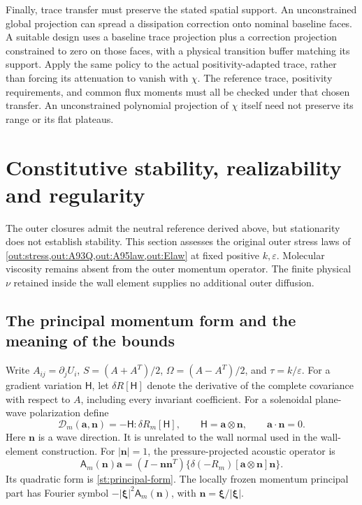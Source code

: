 \documentclass[11pt,a4paper]{article}
\numberwithin{equation}{section}
\newcommand{\eps}{\varepsilon}
\begin{document}
Finally, trace transfer must preserve the stated spatial support.
An unconstrained global projection can spread a dissipation
correction onto nominal baseline faces.  A suitable design uses a
baseline trace projection plus a correction projection constrained
to zero on those faces, with a physical transition buffer matching
its support.  Apply the same policy to the actual positivity-adapted
trace, rather than forcing its attenuation to vanish with $\chi$.
The reference trace, positivity requirements, and common flux
moments must all be checked under that chosen transfer.  An
unconstrained polynomial projection of $\chi$ itself need not preserve
its range or its flat plateaus.

\section{Constitutive stability, realizability and regularity}
\label{st:constitutive}

The outer closures admit the neutral reference derived above, but
stationarity does not establish stability. This section assesses the
original outer stress laws of
\cref{out:stress,out:A93Q,out:A95law,out:Elaw} at fixed positive
$k,\eps$. Molecular
viscosity remains absent from the outer momentum operator. The finite
physical $\nu$ retained inside the wall element supplies no additional
outer diffusion.

\subsection{The principal momentum form and the meaning of the bounds}
\label{st:principal}

Write $A_{ij}=\partial_jU_i$, $S=(A+A^T)/2$,
$\Omega=(A-A^T)/2$, and $\tau=k/\eps$. For a gradient variation
$\mathsf H$, let $\delta R[\mathsf H]$ denote the derivative of the
complete covariance with respect to $A$, including every invariant
coefficient. For a solenoidal plane-wave polarization define
\begin{equation}
 \boxed{
 \mathcal D_m(\boldsymbol a,\boldsymbol n)
 =-\mathsf H:\delta R_m[\mathsf H],\qquad
 \mathsf H=\boldsymbol a\otimes\boldsymbol n,\qquad
 \boldsymbol a\cdot\boldsymbol n=0.}
 \label{st:principal-form}
\end{equation}
Here $\boldsymbol n$ is a wave direction. It is unrelated to the wall
normal used in the wall-element construction. For $|\boldsymbol n|=1$,
the pressure-projected acoustic operator is
\[
 \mathsf A_m(\boldsymbol n)\boldsymbol a
 =(I-\boldsymbol n\boldsymbol n^T)
   \{\delta(-R_m)[\boldsymbol a\otimes\boldsymbol n]\boldsymbol n\}.
\]
Its quadratic form is \cref{st:principal-form}. The locally frozen
momentum principal part has Fourier symbol
$-|\boldsymbol\xi|^2\mathsf A_m(\boldsymbol n)$, with
$\boldsymbol n=\boldsymbol\xi/|\boldsymbol\xi|$.
\end{document}
